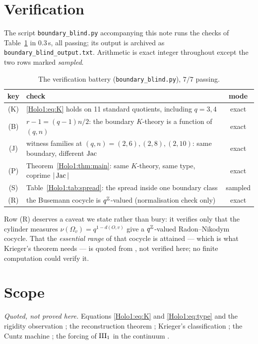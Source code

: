 \section{Verification}\label{Holo1:sec:battery}

The script \texttt{boundary\_blind.py} accompanying this note runs the checks of
Table~\ref{Holo1:tab:battery} in $0.3$\,s, all passing; its output is archived as
\texttt{boundary\_blind\_output.txt}. Arithmetic is exact integer throughout except the two
rows marked \emph{sampled}.

\begin{table}[ht]
\centering\small
\begin{tabular}{clc}
\toprule
key & check & mode\\
\midrule
(K) & \eqref{Holo1:eq:K} holds on 11 standard quotients, including $q=3,4$ & exact\\
(B) & $r-1=(q-1)n/2$: the boundary $K$-theory is a function of $(q,n)$ & exact\\
(J) & witness families at $(q,n)=(2,6),(2,8),(2,10)$: same boundary, different $\operatorname{Jac}$ & exact\\
(P) & Theorem~\ref{Holo1:thm:main}: same $K$-theory, same type, coprime $|\operatorname{Jac}|$ & exact\\
(S) & Table~\ref{Holo1:tab:spread}: the spread inside one boundary class & sampled\\
(R) & the Busemann cocycle is $q^{\mathbb{Z}}$-valued (normalisation check only) & exact\\
\bottomrule
\end{tabular}
\caption{The verification battery (\texttt{boundary\_blind.py}), $7/7$ passing.}
\label{Holo1:tab:battery}
\end{table}

Row (R) deserves a caveat we state rather than bury: it verifies only that the cylinder
measures $\nu(\Omega_v)=q^{1-d(O,v)}$ give a $q^{\mathbb{Z}}$-valued Radon--Nikodym cocycle. That
the \emph{essential range} of that cocycle is attained --- which is what Krieger's theorem
\cite{Krieger76} needs --- is quoted from \cite{RR97,Rob05}, not verified here; no finite
computation could verify it.

\section{Scope}\label{Holo1:sec:scope}

\emph{Quoted, not proved here.} Equations \eqref{Holo1:eq:K} and \eqref{Holo1:eq:type} and the
rigidity observation \cite{Rob05}; the reconstruction theorem \cite{CM13}; Krieger's
classification \cite{Krieger76}; the Cuntz machine \cite{Cuntz81}; the forcing of
$\mathrm{III}_1$ in the continuum \cite{FLMO23,Wiesbrock93,BDF87}.

